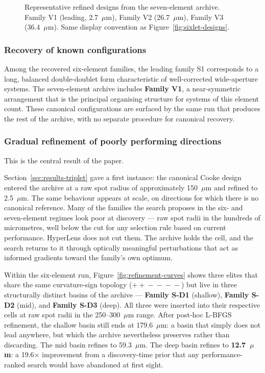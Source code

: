 \begin{figure}[h]
    \centering
    \caption{Representative refined designs from the seven-element archive. Family V1 (leading, 2.7~$\mu$m), Family V2 (26.7~$\mu$m), Family V3 (36.4~$\mu$m). Same display convention as Figure~\ref{fig:sixlet-designs}.}
    \label{fig:seventuplet-designs}
\end{figure}

\subsubsection{Recovery of known configurations}

Among the recovered six-element families, the leading family S1 corresponds to a long, balanced double-doublet form characteristic of well-corrected wide-aperture systems. The seven-element archive includes \textbf{Family V1}, a near-symmetric arrangement that is the principal organising structure for systems of this element count. These canonical configurations are surfaced by the same run that produces the rest of the archive, with no separate procedure for canonical recovery.

\subsubsection{Gradual refinement of poorly performing directions}

This is the central result of the paper.

Section~\ref{sec:results-triplet} gave a first instance: the canonical Cooke design entered the archive at a raw spot radius of approximately 150~$\mu$m and refined to 2.5~$\mu$m. The same behaviour appears at scale, on directions for which there is no canonical reference. Many of the families the search proposes in the six- and seven-element regimes look poor at discovery — raw spot radii in the hundreds of micrometres, well below the cut for any selection rule based on current performance. HyperLens does not cut them. The archive holds the cell, and the search returns to it through optically meaningful perturbations that act as informed gradients toward the family's own optimum.

Within the six-element run, Figure~\ref{fig:refinement-curves} shows three elites that share the same curvature-sign topology ($+\!+\!-\!-\!-\!-$) but live in three structurally distinct basins of the archive — \textbf{Family S-D1} (shallow), \textbf{Family S-D2} (mid), and \textbf{Family S-D3} (deep). All three were inserted into their respective cells at raw spot radii in the 250–300~$\mu$m range. After post-hoc L-BFGS refinement, the shallow basin still ends at 179.6~$\mu$m: a basin that simply does not lead anywhere, but which the archive nevertheless preserves rather than discarding. The mid basin refines to 59.3~$\mu$m. The deep basin refines to \textbf{12.7~$\mu$m}: a 19.6$\times$ improvement from a discovery-time prior that any performance-ranked search would have abandoned at first sight.

